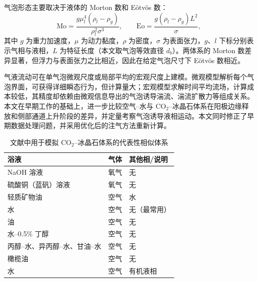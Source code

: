 \documentclass[UTF8,11pt,a4paper,fontset=fandol]{ctexart}
\begin{document}
气泡形态主要取决于液体的 Morton 数和 E\"otv\"os 数：
\[
 \mathrm{Mo}=\frac{g\mu_l^4(\rho_l-\rho_g)}{\rho_l^2\sigma^3},\qquad
 \mathrm{Eo}=\frac{g(\rho_l-\rho_g)L^2}{\sigma},
\]
其中 $g$ 为重力加速度，$\mu$ 为动力黏度，$\rho$ 为密度，$\sigma$ 为表面张力，$g$、$l$ 下标分别表示气相与液相，$L$ 为特征长度（本文取气泡等效直径 $d_b$）。两体系的 Morton 数差异显著，但浮力与表面张力之比相近，因此在给定气泡尺寸下 E\"otv\"os 数相近。

气液流动可在单气泡微观尺度或局部平均的宏观尺度上建模。微观模型解析每个气泡界面，可获得详细瞬态行为，但计算量大；宏观模型求解时间平均流场，计算成本较低，其精度却依赖由微观信息导出的气泡诱导湍流、湍流扩散力等组成关系。本文在早期工作的基础上，进一步比较空气--水与 $\mathrm{CO_2}$--冰晶石体系在阳极边缘释放和侧部通道上升阶段的差异，并定量考察气泡诱导液相运动。本文同时修正了早期数据处理问题，并采用优化后的注气方法重新计算。

\begin{table}[H]
\centering\small
\caption{文献中用于模拟 $\mathrm{CO_2}$--冰晶石体系的代表性相似体系}
\begin{tabular}{lll}
\toprule 浴液 & 气体 & 其他相/说明\\ \midrule
NaOH 溶液 & 氧气 & 无\\
硫酸铜（蓝矾）溶液 & 氧气 & 无\\
轻质矿物油 & 空气 & 水\\
水 & 空气 & 无（最常用）\\
油 & 空气 & 无\\
水--0.5\% 丁醇 & 空气 & 无\\
丙醇--水、异丙醇--水、甘油--水 & 空气 & 无\\
橄榄油 & 空气 & 无\\
水 & 空气 & 有机液相\\ \bottomrule
\end{tabular}
\end{table}
\end{document}
